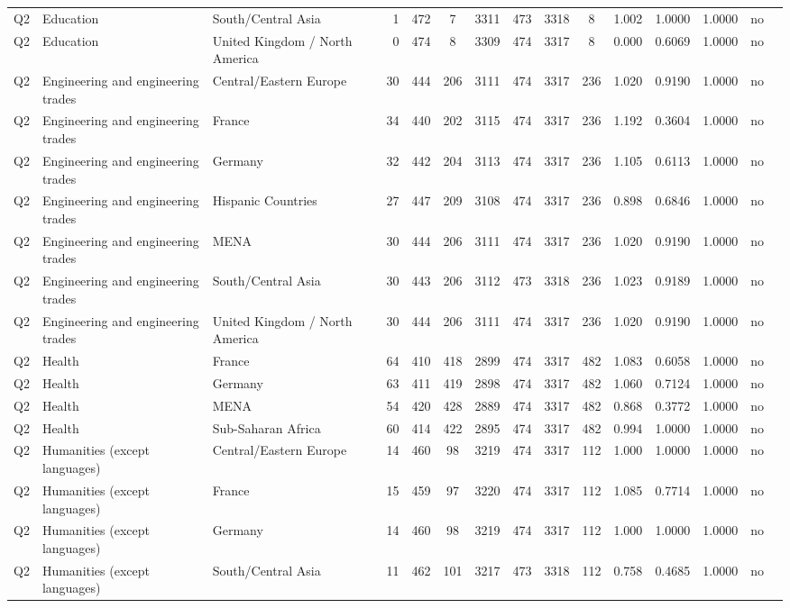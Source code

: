 \begin{longtable}{lllrcccccccccll}
Q2 & Education & South/Central Asia & 1 & 472 & 7 & 3311 & 473 & 3318 & 8 & 1.002 & 1.0000 & 1.0000 & no \\
Q2 & Education & United Kingdom / North America & 0 & 474 & 8 & 3309 & 474 & 3317 & 8 & 0.000 & 0.6069 & 1.0000 & no \\
Q2 & Engineering and engineering trades & Central/Eastern Europe & 30 & 444 & 206 & 3111 & 474 & 3317 & 236 & 1.020 & 0.9190 & 1.0000 & no \\
Q2 & Engineering and engineering trades & France & 34 & 440 & 202 & 3115 & 474 & 3317 & 236 & 1.192 & 0.3604 & 1.0000 & no \\
Q2 & Engineering and engineering trades & Germany & 32 & 442 & 204 & 3113 & 474 & 3317 & 236 & 1.105 & 0.6113 & 1.0000 & no \\
Q2 & Engineering and engineering trades & Hispanic Countries & 27 & 447 & 209 & 3108 & 474 & 3317 & 236 & 0.898 & 0.6846 & 1.0000 & no \\
Q2 & Engineering and engineering trades & MENA & 30 & 444 & 206 & 3111 & 474 & 3317 & 236 & 1.020 & 0.9190 & 1.0000 & no \\
Q2 & Engineering and engineering trades & South/Central Asia & 30 & 443 & 206 & 3112 & 473 & 3318 & 236 & 1.023 & 0.9189 & 1.0000 & no \\
Q2 & Engineering and engineering trades & United Kingdom / North America & 30 & 444 & 206 & 3111 & 474 & 3317 & 236 & 1.020 & 0.9190 & 1.0000 & no \\
Q2 & Health & France & 64 & 410 & 418 & 2899 & 474 & 3317 & 482 & 1.083 & 0.6058 & 1.0000 & no \\
Q2 & Health & Germany & 63 & 411 & 419 & 2898 & 474 & 3317 & 482 & 1.060 & 0.7124 & 1.0000 & no \\
Q2 & Health & MENA & 54 & 420 & 428 & 2889 & 474 & 3317 & 482 & 0.868 & 0.3772 & 1.0000 & no \\
Q2 & Health & Sub-Saharan Africa & 60 & 414 & 422 & 2895 & 474 & 3317 & 482 & 0.994 & 1.0000 & 1.0000 & no \\
Q2 & Humanities (except languages) & Central/Eastern Europe & 14 & 460 & 98 & 3219 & 474 & 3317 & 112 & 1.000 & 1.0000 & 1.0000 & no \\
Q2 & Humanities (except languages) & France & 15 & 459 & 97 & 3220 & 474 & 3317 & 112 & 1.085 & 0.7714 & 1.0000 & no \\
Q2 & Humanities (except languages) & Germany & 14 & 460 & 98 & 3219 & 474 & 3317 & 112 & 1.000 & 1.0000 & 1.0000 & no \\
Q2 & Humanities (except languages) & South/Central Asia & 11 & 462 & 101 & 3217 & 473 & 3318 & 112 & 0.758 & 0.4685 & 1.0000 & no \\

\end{longtable}

